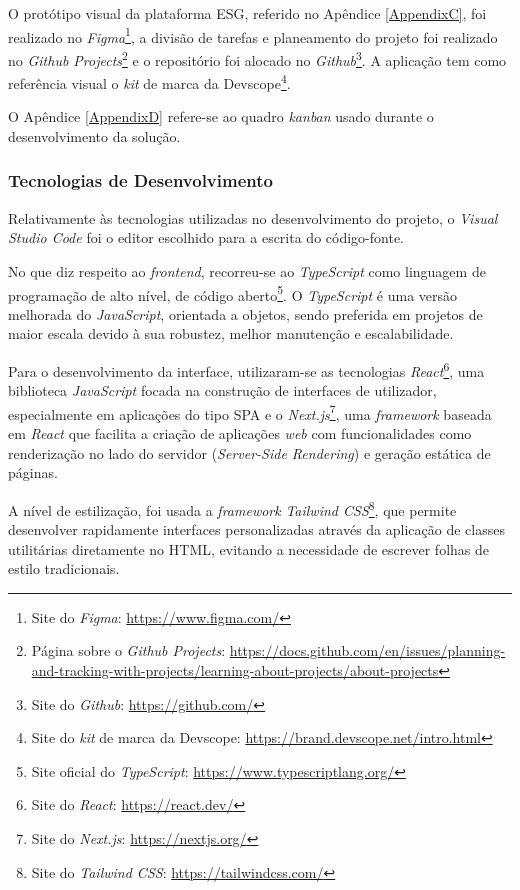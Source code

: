 O protótipo visual da plataforma \gls{ESG}, referido no Apêndice \ref{AppendixC}, foi realizado no \textit{Figma}\footnote{Site do \textit{Figma}: \url{https://www.figma.com/}}, a divisão de tarefas e planeamento do projeto foi realizado no \textit{Github Projects}\footnote{Página sobre o \textit{Github Projects}: \url{https://docs.github.com/en/issues/planning-and-tracking-with-projects/learning-about-projects/about-projects}} e o repositório foi alocado no \textit{Github}\footnote{Site do \textit{Github}: \url{https://github.com/}}. A aplicação tem como referência visual o \textit{kit} de marca da Devscope\footnote{Site do \textit{kit} de marca da Devscope: \url{https://brand.devscope.net/intro.html}}.

O Apêndice \ref{AppendixD} refere-se ao quadro \textit{kanban} usado durante o desenvolvimento da solução.

\subsubsection{Tecnologias de Desenvolvimento}

Relativamente às tecnologias utilizadas no desenvolvimento do projeto, o \textit{Visual Studio Code} foi o editor escolhido para a escrita do código-fonte.

No que diz respeito ao \textit{frontend}, recorreu-se ao \textit{TypeScript} como linguagem de programação de alto nível, de código aberto\footnote{Site oficial do \textit{TypeScript}: \url{https://www.typescriptlang.org/}}. O \textit{TypeScript} é uma versão melhorada do \textit{JavaScript}, orientada a objetos, sendo preferida em projetos de maior escala devido à sua robustez, melhor manutenção e escalabilidade.

Para o desenvolvimento da interface, utilizaram-se as tecnologias \textit{React}\footnote{Site do \textit{React}: \url{https://react.dev/}}, uma biblioteca \textit{JavaScript} focada na construção de interfaces de utilizador, especialmente em aplicações do tipo \gls{SPA} e o \textit{Next.js}\footnote{Site do \textit{Next.js}: \url{https://nextjs.org/}}, uma \textit{framework} baseada em \textit{React} que facilita a criação de aplicações \textit{web} com funcionalidades como renderização no lado do servidor (\textit{Server-Side Rendering}) e geração estática de páginas.

A nível de estilização, foi usada a \textit{framework} \textit{Tailwind CSS}\footnote{Site do \textit{Tailwind CSS}: \url{https://tailwindcss.com/}}, que permite desenvolver rapidamente interfaces personalizadas através da aplicação de classes utilitárias diretamente no HTML, evitando a necessidade de escrever folhas de estilo tradicionais.

